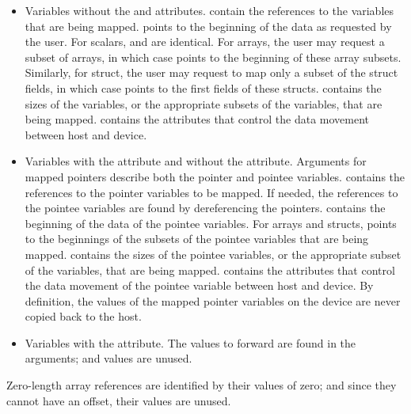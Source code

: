 %
\begin{itemize}
  \item Variables without the  and  attributes.   contain the references to the variables that are being mapped.   points to the beginning of the data as requested by the user. For scalars,   and  are identical. For arrays, the user may request a subset of arrays, in which case  points to the beginning of these array subsets. Similarly, for struct, the user may request to map only a subset of the struct fields, in which case   points to the first fields of these structs.  contains the sizes of the variables, or the appropriate subsets of the variables, that are being mapped.  contains the attributes that control the data movement between host and device.

  \item Variables with the  attribute and without the  attribute. Arguments for mapped pointers describe both the pointer and pointee variables.   contains the references to the pointer variables to be mapped.  If needed, the references to the pointee variables are found by dereferencing the  pointers.  contains the beginning of the data of the pointee variables.   For arrays and structs,  points to the beginnings of the subsets of the pointee variables that are being mapped.  contains the sizes of the pointee variables, or the appropriate subset of the variables, that are being mapped.   contains the attributes that control the data movement of the pointee variable between host and device. By definition, the values of the mapped pointer variables on the device are never copied back to the host.
  
  \item Variables with the  attribute. The values to forward are found in the  arguments;   and  values are unused.
%
\end{itemize}

\fussy

Zero-length array references are identified by their  values of zero; and since they cannot have an offset, their  values are unused.

